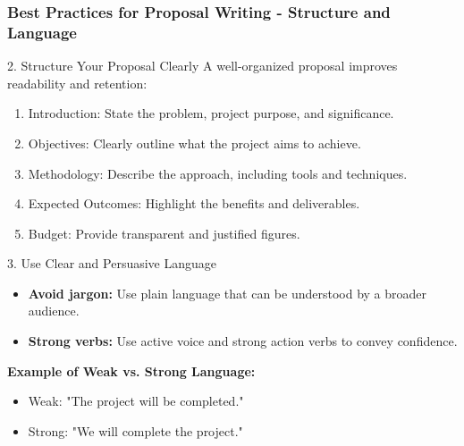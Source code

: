 \documentclass[aspectratio=169]{beamer}
\begin{document}
\begin{frame}[fragile]
    \frametitle{Best Practices for Proposal Writing - Structure and Language}
    \begin{block}{2. Structure Your Proposal Clearly}
        A well-organized proposal improves readability and retention:
        \begin{enumerate}
            \item Introduction: State the problem, project purpose, and significance.
            \item Objectives: Clearly outline what the project aims to achieve.
            \item Methodology: Describe the approach, including tools and techniques.
            \item Expected Outcomes: Highlight the benefits and deliverables.
            \item Budget: Provide transparent and justified figures.
        \end{enumerate}
    \end{block}

    \begin{block}{3. Use Clear and Persuasive Language}
        \begin{itemize}
            \item \textbf{Avoid jargon:} Use plain language that can be understood by a broader audience.
            \item \textbf{Strong verbs:} Use active voice and strong action verbs to convey confidence.
        \end{itemize}
        \textbf{Example of Weak vs. Strong Language:}
        \begin{itemize}
            \item Weak: "The project will be completed."
            \item Strong: "We will complete the project."
        \end{itemize}
    \end{block}
\end{frame}
\end{document}
